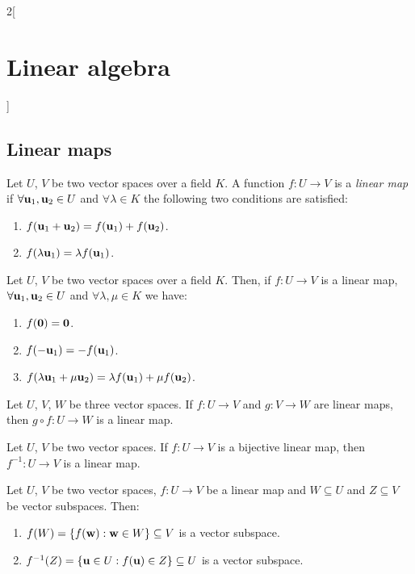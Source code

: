 \documentclass[../../../main.tex]{subfiles}
\begin{document}
\begin{multicols}{2}[\section{Linear algebra}]
  \subsection{Linear maps}
  \begin{definition}
    Let $U$, $V$ be two vector spaces over a field $K$. A function $f:U\rightarrow V$ is a \textit{linear map} if $\forall\vb{u}_1,\vb{u}_2\in U$ and $\forall\lambda\in K$ the following two conditions are satisfied:
    \begin{enumerate}
      \item $f(\vb{u}_1+\vb{u}_2)=f(\vb{u}_1)+f(\vb{u}_2)$.
      \item $f(\lambda \vb{u}_1)=\lambda f(\vb{u}_1)$.
    \end{enumerate}
  \end{definition}
  \begin{prop}
    Let $U$, $V$ be two vector spaces over a field $K$. Then, if $f:U\rightarrow V$ is a linear map, $\forall\vb{u}_1,\vb{u}_2\in U$ and $\forall\lambda,\mu\in K$ we have:
    \begin{enumerate}
      \item $f(\vb{0})=\vb{0}$.
      \item $f(-\vb{u}_1)=-f(\vb{u}_1)$.
      \item $f(\lambda\vb{u}_1+\mu\vb{u}_2)=\lambda f(\vb{u}_1)+\mu f(\vb{u}_2)$.
    \end{enumerate}
  \end{prop}
  \begin{prop}
    Let $U$, $V$, $W$ be three vector spaces. If $f:U\rightarrow V$ and $g:V\rightarrow W$ are linear maps, then $g\circ f:U\rightarrow W$ is a linear map.
  \end{prop}
  \begin{prop}
    Let $U$, $V$ be two vector spaces. If $f:U\rightarrow V$ is a bijective linear map, then $f^{-1}:U\rightarrow V$ is a linear map.
  \end{prop}
  \begin{prop}
    Let $U$, $V$ be two vector spaces, $f:U\rightarrow V$ be a linear map and $W\subseteq U$ and $Z\subseteq V$ be vector subspaces. Then:
    \begin{enumerate}
      \item $f(W)=\{f(\vb{w}): \vb{w}\in W\}\subseteq V$ is a vector subspace.
      \item $f^{-1}(Z)=\{\vb{u}\in U: f(\vb{u})\in Z\}\subseteq U$ is a vector subspace.

\end{enumerate}
\end{prop}
\end{multicols}
\end{document}
